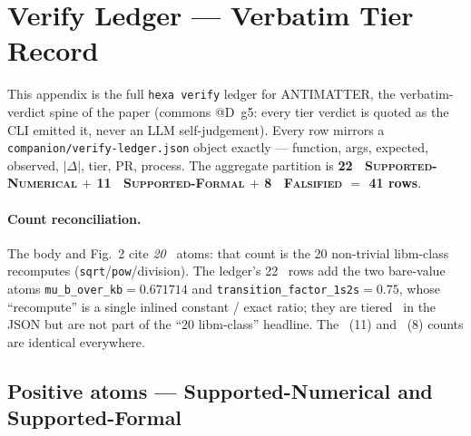 \section{Verify Ledger --- Verbatim Tier Record}
\label{app:verify-ledger}

This appendix is the full \texttt{hexa verify} ledger for ANTIMATTER, the
verbatim-verdict spine of the paper (commons @D~g5: every tier verdict is
quoted as the CLI emitted it, never an LLM self-judgement). Every row mirrors
a \texttt{companion/verify-ledger.json} object exactly --- function, args,
expected, observed, $|\Delta|$, tier, PR, process. The aggregate partition is
\textbf{22 \tierGreen\ \textsc{Supported-Numerical} $+$ 11 \tierBlue\
\textsc{Supported-Formal} $+$ 8 \tierRed\ \textsc{Falsified} $=$ 41 rows}.

\paragraph{Count reconciliation.} The body and Fig.~2 cite \emph{20}
\tierGreen\ atoms: that count is the 20 non-trivial libm-class recomputes
(\texttt{sqrt}/\texttt{pow}/division). The ledger's 22 \tierGreen\ rows add
the two bare-value atoms \verb|mu_b_over_kb|$=0.671714$ and
\verb|transition_factor_1s2s|$=0.75$, whose ``recompute'' is a single inlined
constant / exact ratio; they are tiered \tierGreen\ in the JSON but are not
part of the ``20 libm-class'' headline. The \tierBlue\ (11) and \tierRed\ (8)
counts are identical everywhere.

\subsection{Positive atoms --- Supported-Numerical and Supported-Formal}
\label{app:vl-positive}

